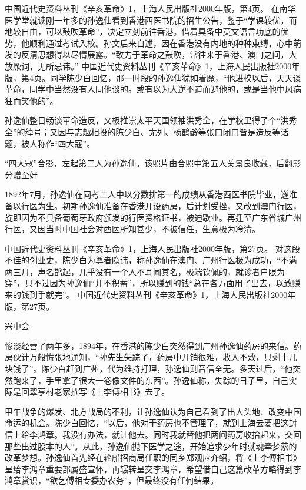 \documentclass[12pt,UTF8]{ctexbook}
\begin{document}
中国近代史资料丛刊《辛亥革命》1，上海人民出版社2000年版，第4页。
在南华医学堂就读刚一年多的孙逸仙看到香港西医书院的招生公告，鉴于“学课较优，而地较自由，可以鼓吹革命”，决定立刻前往香港。借着具备中英文语言功底的优势，他顺利通过考试入校。孙文后来自述，因在香港没有内地的种种束缚，心中萌发的反清思想得以尽情展露。“致力于革命之鼓吹，常往来于香港、澳门之间，大放厥词，无所忌讳。” 中国近代史资料丛刊《辛亥革命》1，上海人民出版社2000年版，第4页。同学陈少白回忆，那一时段的孙逸仙犹如着魔，“他进校以后，天天谈革命，同学中当然没有人同他谈的。或有以为大逆不道而避他的，或是当他中风病狂而笑他的”。

孙逸仙整日畅谈革命造反，又极推崇太平天国领袖洪秀全，在学校里得了个“洪秀全”的绰号；又因与志趣相投的陈少白、尢列、杨鹤龄等张口闭口皆是造反等话题，被人称作“四大寇”。


“四大寇”合影，左起第二人为孙逸仙。该照片由合照中第五人关景良收藏，后翻影分赠至好

1892年7月，孙逸仙在同考二人中以分数排第一的成绩从香港西医书院毕业，遂准备以行医为生。初期孙逸仙准备在香港开设药房，后计划受挫，又改到澳门行医，旋即因为不具备葡萄牙政府颁发的行医资格证书，被迫歇业。再迁至广东省城广州行医，又因当时中国社会对西医所知甚少，不被信任，生意极为冷清。

中国近代史资料丛刊《辛亥革命》1，上海人民出版社2000年版，第27页。
对这段不佳的创业史，陈少白为尊者隐讳，称孙逸仙在澳门、广州行医极为成功，“不满两三月，声名鹊起，几乎没有一个人不耳闻其名，极端钦佩的，就诊者户限为穿”，只不过因为孙逸仙“并不积蓄”，所以赚到的钱“总在各方面用了出去，以致赚来的钱到手就完”。 中国近代史资料丛刊《辛亥革命》1，上海人民出版社2000年版，第27页。

兴中会

惨淡经营了两年多，1894年，在香港的陈少白突然得到广州孙逸仙药房的来信。药房伙计万般慌张地通知，“孙先生失踪了，药房中开销很难，收入不敷，只剩十几块钱了”。陈少白赶到广州，代为维持打理，孙逸仙则音信全无。多天过后，“他突然跑来了，手里拿了很大一卷像文件的东西”。孙逸仙称，失踪的日子里，自己实际是回翠亨村老家撰写《上李傅相书》去了。

甲午战争的爆发、北方战局的不利，让孙逸仙认为自己看到了出人头地、改变中国命运的机会。陈少白回忆，“以后，他对于药房也不管理了，就到上海去要把这封信上给李鸿章。我没有办法，就让他去。同时我就替他把两间药房收拾起来，交回那些出过股本的人”。从此，孙逸仙抛下医学之途，开始追求少年时就魂牵梦萦的改革梦想。孙逸仙首先经在轮船招商局任职的同乡郑观应介绍，将《上李傅相书》呈给李鸿章重要部属盛宣怀，再辗转呈交李鸿章，希望借自己这篇改革方略得到李鸿章赏识，“欲乞傅相专委办农务”，但最终没有任何结果。
\end{document}
